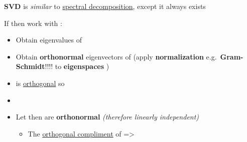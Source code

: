 \hSep %

\textbf{SVD} is \emph{similar} to \underline{spectral decomposition}, except it always exists

If  then work with :
\begin{itemize}
      \item
            Obtain eigenvalues
             of
      \item
            Obtain \textbf{orthonormal} eigenvectors
             of
             (apply \textbf{normalization}
            e.g.~\textbf{Gram-Schmidt}!!!! to \textbf{eigenspaces}
            )
      \item
            is \underline{orthogonal} so 
      \item
      \item
            Let
            then
             are
            \textbf{orthonormal} \emph{(therefore linearly independent)}

            \begin{itemize}

                  \item
                        The \underline{orthogonal compliment} of
                        =\textgreater{}

                        \begin{itemize}


\end{itemize}
\end{itemize}
\end{itemize}
